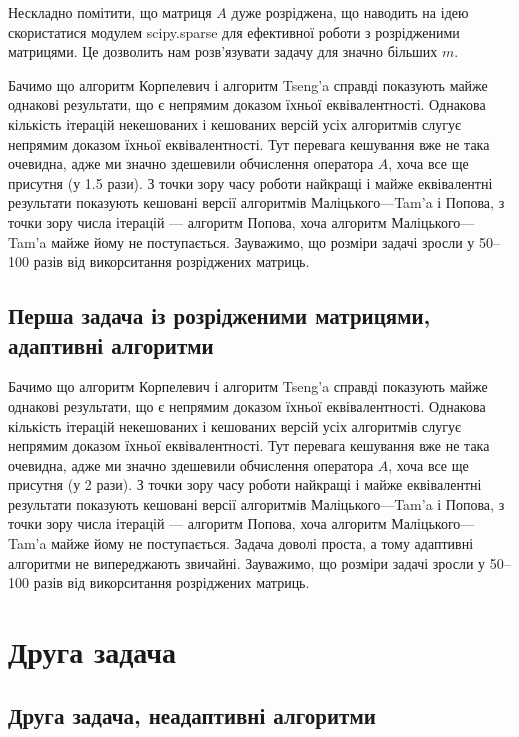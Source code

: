 Нескладно помітити, що матриця $A$ дуже розріджена, що наводить на ідею скористатися модулем scipy.sparse для ефективної роботи з розрідженими матрицями. Це дозволить нам розв'язувати задачу для значно більших $m$.



Бачимо що алгоритм Корпелевич і алгоритм Tseng'a справді показують майже однакові результати, що є непрямим доказом їхньої еквівалентності. Однакова кількість ітерацій некешованих і кешованих версій усіх алгоритмів слугує непрямим доказом їхньої еквівалентності. Тут перевага кешування вже не така очевидна, адже ми значно здешевили обчислення оператора $A$, хоча все ще присутня (у 1.5 рази). З точки зору часу роботи найкращі і майже еквівалентні результати показують кешовані версії алгоритмів Маліцького---Tam'a і Попова, з точки зору числа ітерацій --- алгоритм Попова, хоча алгоритм Маліцького---Tam'a майже йому не поступається. Зауважимо, що розміри задачі зросли у 50--100 разів від викорситання розріджених матриць.

\newpage\subsection{Перша задача із розрідженими матрицями, адаптивні алгоритми}



Бачимо що алгоритм Корпелевич і алгоритм Tseng'a справді показують майже однакові результати, що є непрямим доказом їхньої еквівалентності. Однакова кількість ітерацій некешованих і кешованих версій усіх алгоритмів слугує непрямим доказом їхньої еквівалентності. Тут перевага кешування вже не така очевидна, адже ми значно здешевили обчислення оператора $A$, хоча все ще присутня (у 2 рази). З точки зору часу роботи найкращі і майже еквівалентні результати показують кешовані версії алгоритмів Маліцького---Tam'a і Попова, з точки зору числа ітерацій --- алгоритм Попова, хоча алгоритм Маліцького---Tam'a майже йому не поступається. Задача доволі проста, а тому адаптивні алгоритми не випереджають звичайні. Зауважимо, що розміри задачі зросли у 50--100 разів від викорситання розріджених матриць.

\section{Друга задача}

\subsection{Друга задача, неадаптивні алгоритми}

